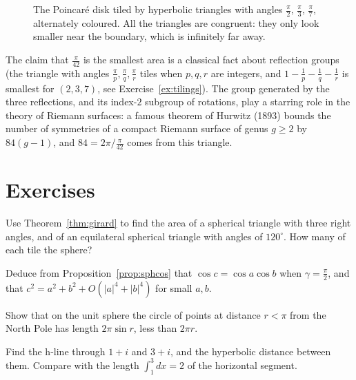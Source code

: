 \begin{figure}[ht]
\centering
{}
\caption{The Poincar\'e disk tiled by hyperbolic triangles with angles $\frac\pi2$, $\frac\pi3$, $\frac\pi7$, alternately coloured. All the triangles are
congruent: they only look smaller near the boundary, which is infinitely far away.}
\label{fig:tiling}
\end{figure}

\begin{remark}
The claim that $\frac\pi{42}$ is the smallest area is a classical fact about reflection groups (the triangle with angles $\frac\pi p,\frac\pi q,\frac\pi r$ tiles
when $p,q,r$ are integers, and $1-\frac1p-\frac1q-\frac1r$ is smallest for $(2,3,7)$, see Exercise~\ref{ex:tilings}). The group generated by the three
reflections, and its index-$2$ subgroup of rotations, play a starring role in the theory of Riemann surfaces: a famous theorem of Hurwitz (1893) bounds
the number of symmetries of a compact Riemann surface of genus $g\ge2$ by $84(g-1)$, and $84=2\pi/\frac\pi{42}$ comes from this triangle.
\end{remark}

\section{Exercises}

\begin{exercise}[$\star$]\label{ex:lune}
Use Theorem~\ref{thm:girard} to find the area of a spherical triangle with three right angles, and of an equilateral spherical triangle with angles of
$120^\circ$. How many of each tile the sphere?
\end{exercise}

\begin{exercise}[$\star$]\label{ex:sphpythag}
Deduce from Proposition~\ref{prop:sphcos} that $\cos c=\cos a\cos b$ when $\gamma=\frac\pi2$, and that $c^2=a^2+b^2+O(|a|^4+|b|^4)$ for small $a,b$.
\end{exercise}

\begin{exercise}[$\star$]\label{ex:sphcircle}
Show that on the unit sphere the circle of points at distance $r<\pi$ from the North Pole has length $2\pi\sin r$, less than $2\pi r$.
\end{exercise}

\begin{exercise}[$\star$]\label{ex:hpdist}
Find the h-line through $1+i$ and $3+i$, and the hyperbolic distance between them. Compare with the length $\int_1^3dx=2$ of the horizontal segment.
\end{exercise}

